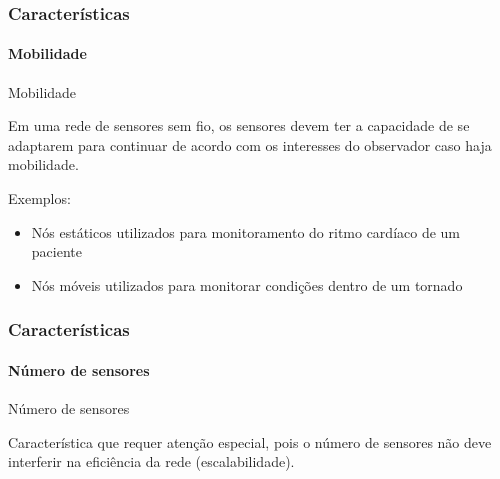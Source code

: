 \documentclass[notes]{beamer}
\begin{document}
\begin{frame}
\label{slide_18}
\frametitle{Características}
\framesubtitle{Mobilidade}

\begin{block}{Mobilidade}

Em uma rede de sensores sem fio, os sensores devem ter a capacidade de se adaptarem para continuar de acordo com os interesses do observador caso haja mobilidade.
\end{block} \pause

\begin{exampleblock}

Exemplos: \pause

\begin{itemize}
\item Nós estáticos utilizados para monitoramento do ritmo cardíaco de um paciente \pause
\item Nós móveis utilizados para monitorar condições dentro de um tornado~\cite{Twister}
\end{itemize}

\end{exampleblock}

\end{frame}

\begin{frame}
\label{slide_19}
\frametitle{Características}
\framesubtitle{Número de sensores}

\begin{block}{Número de sensores}

Característica que requer atenção especial, pois o número de sensores não deve interferir na eficiência da rede (escalabilidade).
\end{block}

\end{frame}
\end{document}
